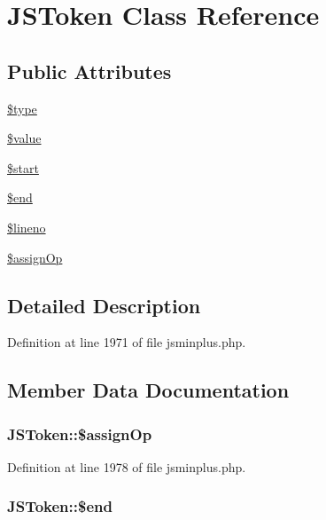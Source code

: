 \hypertarget{classJSToken}{\section{J\+S\+Token Class Reference}
\label{classJSToken}
}
\subsection*{Public Attributes}
\begin{DoxyCompactItemize}
\item 
\hyperlink{classJSToken_af6eb7c362602c2408bb2047d835e358c}{\$type}
\item 
\hyperlink{classJSToken_aed0c48e3c23480420db576e267a79b60}{\$value}
\item 
\hyperlink{classJSToken_ae5b7c81970110aeeab2ac5f65a68fdcc}{\$start}
\item 
\hyperlink{classJSToken_a8654f99ed46aac9393a8851aeb857b2f}{\$end}
\item 
\hyperlink{classJSToken_a47d1838d4f5a136b02e8271c9dfb2a27}{\$lineno}
\item 
\hyperlink{classJSToken_a27d1e0b4e2295daf12234b748c5ddd08}{\$assign\+Op}
\end{DoxyCompactItemize}


\subsection{Detailed Description}


Definition at line 1971 of file jsminplus.\+php.



\subsection{Member Data Documentation}
\hypertarget{classJSToken_a27d1e0b4e2295daf12234b748c5ddd08}{
\subsubsection[{\$assign\+Op}]{\setlength{\rightskip}{0pt plus 5cm}J\+S\+Token\+::\$assign\+Op}}\label{classJSToken_a27d1e0b4e2295daf12234b748c5ddd08}


Definition at line 1978 of file jsminplus.\+php.

\hypertarget{classJSToken_a8654f99ed46aac9393a8851aeb857b2f}{
\subsubsection[{\$end}]{\setlength{\rightskip}{0pt plus 5cm}J\+S\+Token\+::\$end}}\label{classJSToken_a8654f99ed46aac9393a8851aeb857b2f}


